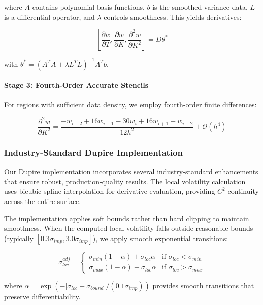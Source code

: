 \documentclass[11pt,a4paper]{article}
\begin{document}
where $A$ contains polynomial basis functions, $b$ is the smoothed variance data, $L$ is a differential operator, and $\lambda$ controls smoothness. This yields derivatives:

\begin{equation}
\left[\frac{\partial w}{\partial T}, \frac{\partial w}{\partial K}, \frac{\partial^2 w}{\partial K^2}\right] = D\theta^*
\end{equation}

with $\theta^* = (A^TA + \lambda L^TL)^{-1}A^Tb$.

\paragraph{Stage 3: Fourth-Order Accurate Stencils}
For regions with sufficient data density, we employ fourth-order finite differences:

\begin{equation}
\frac{\partial^2 w}{\partial K^2} = \frac{-w_{i-2} + 16w_{i-1} - 30w_i + 16w_{i+1} - w_{i+2}}{12h^2} + \mathcal{O}(h^4)
\end{equation}

\subsubsection{Industry-Standard Dupire Implementation}

Our Dupire implementation incorporates several industry-standard enhancements that ensure robust, production-quality results. The local volatility calculation uses bicubic spline interpolation for derivative evaluation, providing $C^2$ continuity across the entire surface.

The implementation applies soft bounds rather than hard clipping to maintain smoothness. When the computed local volatility falls outside reasonable bounds (typically $[0.3\sigma_{imp}, 3.0\sigma_{imp}]$), we apply smooth exponential transitions:

\begin{equation}
\sigma_{loc}^{adj} = \begin{cases}
\sigma_{min}(1-\alpha) + \sigma_{loc} \alpha & \text{if } \sigma_{loc} < \sigma_{min} \\
\sigma_{max}(1-\alpha) + \sigma_{loc} \alpha & \text{if } \sigma_{loc} > \sigma_{max}
\end{cases}
\end{equation}

where $\alpha = \exp(-|\sigma_{loc} - \sigma_{bound}|/(0.1\sigma_{imp}))$ provides smooth transitions that preserve differentiability.
\end{document}
